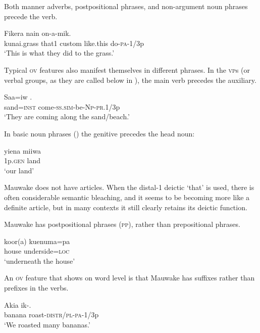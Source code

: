 Both manner adverbs, postpositional phrases, and non-argument noun phrases precede the verb.

\ea%
\label{ex:1:x678}
\gll Fikera  nain     on-a-mik. \\
  kunai.grass  that1  custom  like.this  do-\textsc{pa}-1/3p    \\
\glt `This is what they did to the  grass.'
\z


Typical \textsc{ov} features also manifest themselves in different phrases. In the \textsc{vp}s (or verbal groups, as they are called below in ), the main verb precedes the auxiliary.

\ea%
\label{ex:1:x679}
\gll Saa=iw . \\
 sand=\textsc{inst} come-\textsc{ss}.\textsc{sim}-be-\textsc{Np}-\textsc{pr}.1/3p \\
\glt`They are coming along the sand/beach.'
\z


In basic noun phrases () the genitive precedes the head noun:

\ea%
\label{ex:1:x680}
\gll yiena miiwa \\
 1p.\textsc{gen} land \\
\glt`our land'
\z


Mauwake does not have articles. When the distal-1 deictic  `that' is used, there is often considerable semantic bleaching, and it seems to be becoming more like a definite article, but in many contexts it still clearly retains its deictic function.

Mauwake has postpositional phrases (\textsc{pp}), rather than prepositional phrases.

\ea%
\label{ex:1:x681}
\gll koor(a) kuenuma=pa \\
 house underside=\textsc{loc} \\
\glt`underneath the house'
\z



An \textsc{ov} feature that shows on word level is that Mauwake has suffixes rather than prefixes in the verbs.

\ea%
\label{ex:1:x682}
\gll Akia  ik-. \\
 banana  roast-\textsc{distr}/\textsc{pl}-\textsc{pa}-1/3p     \\
\glt`We roasted many bananas.'
\z


